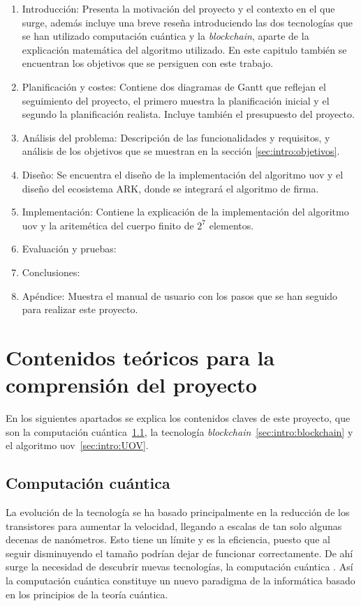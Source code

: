 \begin{enumerate}
	\item Introducción: Presenta la motivación del proyecto y el contexto en el que surge, además incluye una breve reseña introduciendo las dos tecnologías que se han utilizado computación cuántica y la \textit{blockchain}, aparte de la explicación matemática del algoritmo utilizado. En este capitulo también se encuentran los objetivos que se persiguen con este trabajo.
	\item Planificación y costes: Contiene dos diagramas de Gantt que reflejan el seguimiento del proyecto, el primero muestra la planificación inicial y el segundo la planificación realista. Incluye también el presupuesto del proyecto.
	\item Análisis del problema: Descripción de las funcionalidades y requisitos, y análisis de los objetivos que se muestran en la sección \ref{sec:intro:objetivos}.
	\item Diseño: Se encuentra el diseño de la implementación del algoritmo \acrshort{uov} y el diseño del ecosistema ARK, donde se integrará el algoritmo de firma.
	\item Implementación: Contiene la explicación de la implementación del algoritmo \acrshort{uov} y la aritemética del cuerpo finito de $2^7$ elementos.
	\item Evaluación y pruebas: 
	\item Conclusiones:
	\item Apéndice: Muestra el manual de usuario con los pasos que se han seguido para realizar este proyecto.
\end{enumerate}

\section{Contenidos teóricos para la comprensión del proyecto}

En los siguientes apartados se explica los contenidos claves de este proyecto, que son la computación cuántica\ \ref{sec:intro:cc}, la tecnología \textit{blockchain}\ \ref{sec:intro:blockchain} y el algoritmo \acrshort{uov}\ \ref{sec:intro:UOV}.

\subsection{Computación cuántica}\label{sec:intro:cc}

La evolución de la tecnología se ha basado principalmente en la reducción de los transistores para aumentar la velocidad, llegando a escalas de tan solo algunas decenas de nanómetros. Esto tiene un límite y es la eficiencia, puesto que al seguir disminuyendo el tamaño podrían dejar de funcionar correctamente. De ahí surge la necesidad de descubrir nuevas tecnologías, la computación cuántica \cite{computacion-cuantica-wiki}. Así la computación cuántica constituye un nuevo paradigma de la informática basado en los principios de la teoría cuántica.\\

